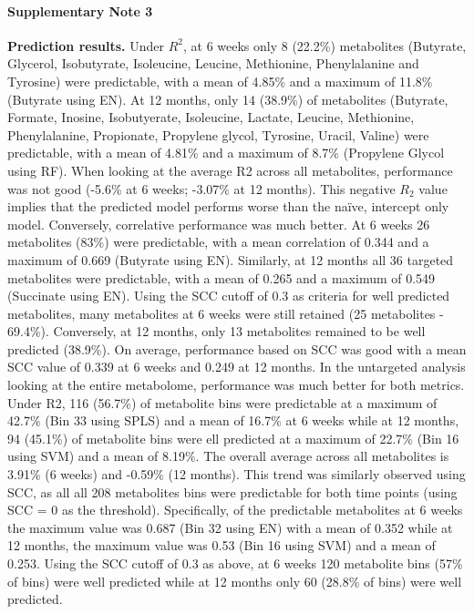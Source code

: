 \paragraph{Supplementary Note 3}
\label{appB_note3}
\textbf{Prediction results.} Under $R^2$, at 6 weeks only 8 (22.2\%) metabolites (Butyrate, Glycerol, Isobutyrate, Isoleucine, Leucine, Methionine, Phenylalanine and Tyrosine) were predictable, with a mean of 4.85\% and a maximum of 11.8\% (Butyrate using EN). At 12 months, only 14 (38.9\%) of metabolites (Butyrate, Formate, Inosine, Isobutyerate, Isoleucine, Lactate, Leucine, Methionine, Phenylalanine, Propionate, Propylene glycol, Tyrosine, Uracil, Valine) were predictable, with a mean of 4.81\% and a maximum of 8.7\% (Propylene Glycol using RF). When looking at the average R2 across all metabolites, performance was not good (-5.6\% at 6 weeks; -3.07\% at 12 months). This negative $R_2$ value implies that the predicted model performs worse than the naïve, intercept only model. Conversely, correlative performance was much better. At 6 weeks 26 metabolites (83\%) were predictable, with a mean correlation of 0.344 and a maximum of 0.669 (Butyrate using EN). Similarly, at 12 months all 36 targeted metabolites were predictable, with a mean of 0.265 and a maximum of 0.549 (Succinate using EN). Using the SCC cutoff of 0.3 as criteria for well predicted metabolites, many metabolites at 6 weeks were still retained (25 metabolites - 69.4\%). Conversely, at 12 months, only 13 metabolites remained to be well predicted (38.9\%). On average, performance based on SCC was good with a mean SCC value of 0.339 at 6 weeks and 0.249 at 12 months. In the untargeted analysis looking at the entire metabolome, performance was much better for both metrics. Under R2, 116 (56.7\%) of metabolite bins were predictable at a maximum of 42.7\% (Bin 33 using SPLS) and a mean of 16.7\% at 6 weeks while at 12 months, 94 (45.1\%) of metabolite bins were ell predicted at a maximum of 22.7\% (Bin 16 using SVM) and a mean of 8.19\%. The overall average across all metabolites is 3.91\% (6 weeks) and -0.59\% (12 months). This trend was similarly observed using SCC, as all all 208 metabolites bins were predictable for both time points (using SCC = 0 as the threshold). Specifically, of the predictable metabolites at 6 weeks the maximum value was 0.687 (Bin 32 using EN) with a mean of 0.352 while at 12 months, the maximum value was 0.53 (Bin 16 using SVM) and a mean of 0.253. Using the SCC cutoff of 0.3 as above, at 6 weeks 120 metabolite bins (57\% of bins) were well predicted while at 12 months only 60 (28.8\% of bins) were well predicted.





